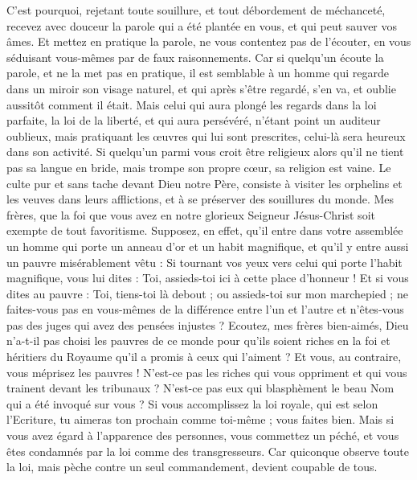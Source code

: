 \begin{multicols}{2}
C'est pourquoi, rejetant toute souillure, et tout débordement de méchanceté, recevez avec douceur la parole qui a été plantée en vous, et qui peut sauver vos âmes.
Et mettez en pratique la parole, ne vous contentez pas de l'écouter, en vous séduisant vous-mêmes par de faux raisonnements.
Car si quelqu'un écoute la parole, et ne la met pas en pratique, il est semblable à un homme qui regarde dans un miroir son visage naturel,
et qui après s'être regardé, s'en va, et oublie aussitôt comment il était.
Mais celui qui aura plongé les regards dans la loi parfaite, la loi de la liberté, et qui aura persévéré, n'étant point un auditeur oublieux, mais pratiquant les œuvres qui lui sont prescrites, celui-là sera heureux dans son activité.
Si quelqu'un parmi vous croit être religieux alors qu’il ne tient pas sa langue en bride, mais trompe son propre cœur, sa religion est vaine.
Le culte pur et sans tache devant Dieu notre Père, consiste à visiter les orphelins et les veuves dans leurs afflictions, et à se préserver des souillures du monde.
\VerseOne{}Mes frères, que la foi que vous avez en notre glorieux Seigneur Jésus-Christ soit exempte de tout favoritisme.
Supposez, en effet, qu’il entre dans votre assemblée un homme qui porte un anneau d'or et un habit magnifique, et qu’il y entre aussi un pauvre misérablement vêtu :
Si tournant vos yeux vers celui qui porte l’habit magnifique, vous lui dites : Toi, assieds-toi ici à cette place d’honneur ! Et si vous dites au pauvre : Toi, tiens-toi là debout ; ou assieds-toi sur mon marchepied ;
ne faites-vous pas en vous-mêmes de la différence entre l’un et l’autre et n'êtes-vous pas des juges qui avez des pensées injustes ?
Ecoutez, mes frères bien-aimés, Dieu n'a-t-il pas choisi les pauvres de ce monde pour qu’ils soient riches en la foi et héritiers du Royaume qu'il a promis à ceux qui l'aiment ?
Et vous, au contraire, vous méprisez les pauvres ! N’est-ce pas les riches qui vous oppriment et qui vous trainent devant les tribunaux ?
N’est-ce pas eux qui blasphèment le beau Nom qui a été invoqué sur vous ?
Si vous accomplissez la loi royale, qui est selon l'Ecriture, tu aimeras ton prochain comme toi-même{} ; vous faites bien.
Mais si vous avez égard à l'apparence des personnes, vous commettez un péché, et vous êtes condamnés par la loi comme des transgresseurs.
Car quiconque observe toute la loi, mais pèche contre un seul commandement, devient coupable de tous.

\end{multicols}
